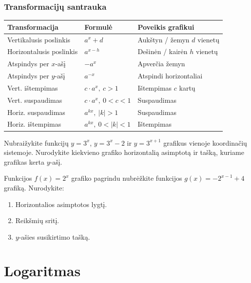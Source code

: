 \subsubsection*{Transformacijų santrauka}

\begin{tcolorbox}[title={Eksponentinės funkcijos $y = a^x$ transformacijos}]
\centering
\renewcommand{\arraystretch}{1.4}
\begin{tabular}{|l|l|l|}
\hline
\textbf{Transformacija} & \textbf{Formulė} & \textbf{Poveikis grafikui} \\
\hline
Vertikalusis poslinkis & $a^x + d$ & Aukštyn / žemyn $d$ vienetų \\
Horizontalusis poslinkis & $a^{x-h}$ & Dešinėn / kairėn $h$ vienetų \\
Atspindys per $x$-ašį & $-a^x$ & Apverčia žemyn \\
Atspindys per $y$-ašį & $a^{-x}$ & Atspindi horizontaliai \\
Vert. ištempimas & $c \cdot a^x,\ c > 1$ & Ištempimas $c$ kartų \\
Vert. suspaudimas & $c \cdot a^x,\ 0 < c < 1$ & Suspaudimas \\
Horiz. suspaudimas & $a^{kx},\ |k|>1$ & Suspaudimas \\
Horiz. ištempimas & $a^{kx},\ 0<|k|<1$ & Ištempimas \\
\hline
\end{tabular}
\end{tcolorbox}

\begin{exercise}
Nubraižykite funkcijų $y = 3^x$, $y = 3^x - 2$ ir $y = 3^{x+1}$ grafikus
vienoje koordinačių sistemoje. Nurodykite kiekvieno grafiko horizontalią
asimptotą ir tašką, kuriame grafikas kerta $y$-ašį.
\end{exercise}

\begin{exercise}
Funkcijos $f(x) = 2^x$ grafiko pagrindu nubrėžkite funkcijos
$g(x) = -2^{x-1} + 4$ grafiką. Nurodykite:
\begin{enumerate}[label=\alph*)]
    \item Horizontalios asimptotos lygtį.
    \item Reikšmių sritį.
    \item $y$-ašies susikirtimo tašką.
\end{enumerate}
\end{exercise}


\section{Logaritmas}

